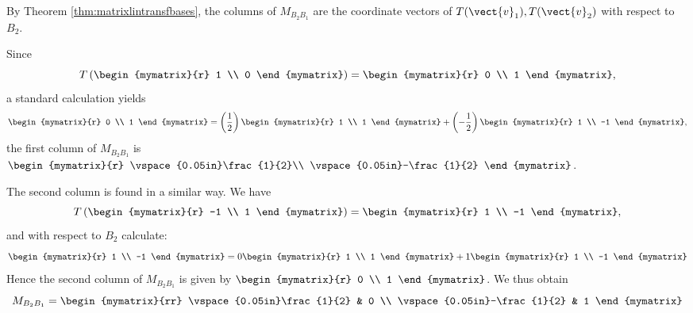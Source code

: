 \begin{solution}
By Theorem \ref{thm:matrixlintransfbases}, the columns of $M_{B_{2} B_{1}}$ are the
coordinate vectors of $T(\vect{v}_{1}), T(\vect{v}_{2})$ with respect
to $B_2$.

Since \[
T \left( 
\begin{mymatrix}{r}
1 \\
0
\end{mymatrix} \right)
= \begin{mymatrix}{r}
0 \\
1
\end{mymatrix} ,\]
a standard calculation yields 
\[
 \begin{mymatrix}{r}
0 \\
1
\end{mymatrix} 
 =  
\left(\frac{1}{2} \right)\begin{mymatrix}{r}
1 \\
1
\end{mymatrix}
+
\left(-\frac{1}{2} \right)
\begin{mymatrix}{r}
1 \\
-1
\end{mymatrix},
\]
the first column of $M_{B_{2} B_{1}}$ is $\begin{mymatrix}{r}
\vspace{0.05in}\frac{1}{2}\\
\vspace{0.05in}-\frac{1}{2}
\end{mymatrix}$. 

The second column is found in a similar way. We have 
\[
T \left( 
\begin{mymatrix}{r}
-1 \\
1
\end{mymatrix} \right)
= \begin{mymatrix}{r}
1 \\
-1
\end{mymatrix} , \]
and with respect to $B_2$ calculate:
\[ 
\begin{mymatrix}{r}
1 \\
-1
\end{mymatrix}
=
0 \begin{mymatrix}{r}
1 \\
1
\end{mymatrix}
+
1
\begin{mymatrix}{r}
1 \\
-1
\end{mymatrix}
\]
Hence the second column of $M_{B_{2} B_{1}}$ is given by $\begin{mymatrix}{r}
0 \\
1
\end{mymatrix}$. We thus obtain 
\[
M_{B_{2} B_{1}} = \begin{mymatrix}{rr}
\vspace{0.05in}\frac{1}{2} & 0 \\
\vspace{0.05in}-\frac{1}{2} & 1 
\end{mymatrix} \]


\end{solution}

